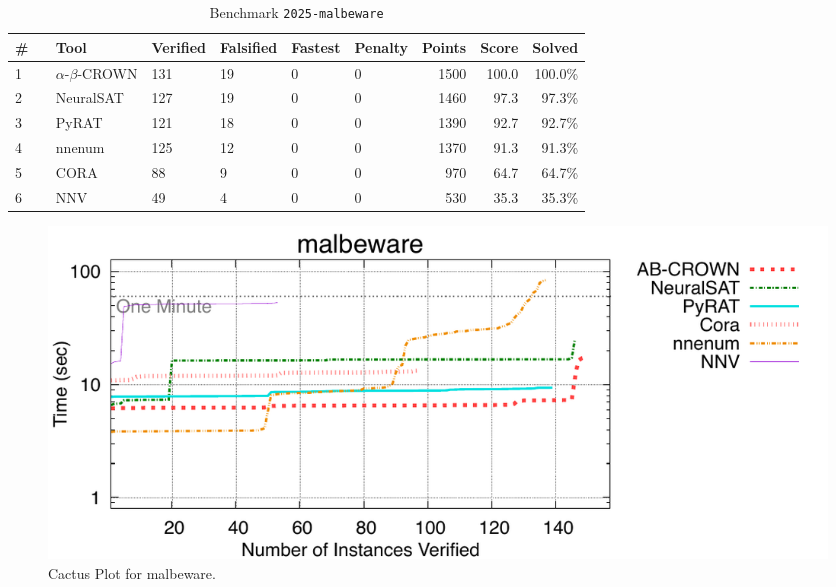 \begin{table}[h]
\begin{center}
\caption{Benchmark \texttt{2025-malbeware}} \label{tab:cat_2025_malbeware}
{\setlength{\tabcolsep}{2pt}
\begin{tabular}[h]{@{}llllllrrr@{}}
\toprule
\textbf{\# ~} & \textbf{Tool} & \textbf{Verified} & \textbf{Falsified} & \textbf{Fastest} & \textbf{Penalty} & \textbf{Points} & \textbf{Score} & \textbf{Solved}\\
\midrule
1 & $\alpha$-$\beta$-CROWN & 131 & 19 & 0 & 0 & 1500 & 100.0 & 100.0\% \\
2 & NeuralSAT & 127 & 19 & 0 & 0 & 1460 & 97.3 & 97.3\% \\
3 & PyRAT & 121 & 18 & 0 & 0 & 1390 & 92.7 & 92.7\% \\
4 & nnenum & 125 & 12 & 0 & 0 & 1370 & 91.3 & 91.3\% \\
5 & CORA & 88 & 9 & 0 & 0 & 970 & 64.7 & 64.7\% \\
6 & NNV & 49 & 4 & 0 & 0 & 530 & 35.3 & 35.3\% \\
\bottomrule
\end{tabular}
}
\end{center}
\end{table}



\begin{figure}[h]
\centerline{\includegraphics[width=\textwidth]{cactus/2025_malbeware.pdf}}
\caption{Cactus Plot for malbeware.}
\label{fig:quantPic}
\end{figure}


\clearpage


